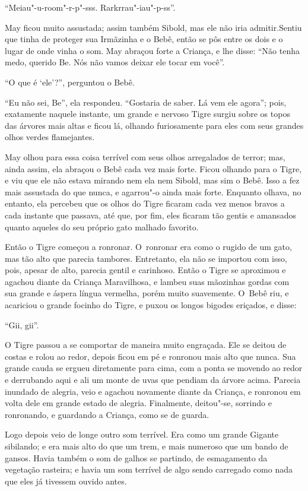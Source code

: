 ``Meiau"-u-room"-r-p"-sss. Rarkrrau"-iau"-p-ss''.

May ficou muito assustada; assim também Sibold, mas ele não iria
admitir.Sentiu que tinha de proteger sua Irmãzinha e o Bebê, então se
pôs entre os dois e o lugar de onde vinha o som. May abraçou forte a
Criança, e lhe disse: ``Não tenha medo, querido Be. Nós não vamos deixar
ele tocar em você''.

``O que é `ele'?'', perguntou o Bebê.

``Eu não sei, Be'', ela respondeu. ``Gostaria de saber. Lá vem ele
agora''; pois, exatamente naquele instante, um grande e nervoso Tigre
surgiu sobre os topos das árvores mais altas e ficou lá, olhando
furiosamente para eles com seus grandes olhos verdes flamejantes.

May olhou para essa coisa terrível com seus olhos arregalados de terror;
mas, ainda assim, ela abraçou o Bebê cada vez mais forte. Ficou olhando
para o Tigre, e viu que ele não estava mirando nem ela nem Sibold, mas
sim o Bebê. Isso a fez mais assustada do que nunca, e agarrou"-o ainda
mais forte. Enquanto olhava, no entanto, ela percebeu que os olhos do
Tigre ficaram cada vez menos bravos a cada instante que passava, até
que, por fim, eles ficaram tão gentis e amansados quanto aqueles do seu
próprio gato malhado favorito.

Então o Tigre começou a ronronar. O~ronronar era como o rugido de um
gato, mas tão alto que parecia tambores. Entretanto, ela não se importou
com isso, pois, apesar de alto, parecia gentil e carinhoso. Então o
Tigre se aproximou e agachou diante da Criança Maravilhosa, e lambeu
suas mãozinhas gordas com sua grande e áspera língua vermelha, porém
muito suavemente. O~Bebê riu, e acariciou o grande focinho do Tigre, e
puxou os longos bigodes eriçados, e disse:

``Gii, gii''.

O Tigre passou a se comportar de maneira muito engraçada. Ele se deitou
de costas e rolou ao redor, depois ficou em pé e ronronou mais alto que
nunca. Sua grande cauda se ergueu diretamente para cima, com a ponta se
movendo ao redor e derrubando aqui e ali um monte de uvas que pendiam da
árvore acima. Parecia inundado de alegria, veio e agachou novamente
diante da Criança, e ronronou em volta dele em grande estado de alegria.
Finalmente, deitou"-se, sorrindo e ronronando, e guardando a Criança,
como se de guarda.

Logo depois veio de longe outro som terrível. Era como um grande Gigante
sibilando; e era mais alto do que um trem, e mais numeroso que um bando
de gansos. Havia também o som de galhos se partindo, de esmagamento da
vegetação rasteira; e havia um som terrível de algo sendo carregado como
nada que eles já tivessem ouvido antes.

